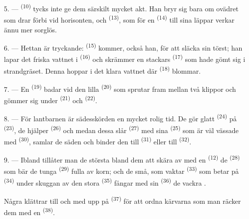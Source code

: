\VUsaut{5.0mm}
\VUsaut{3.4mm}

5. ---  \textsuperscript{(10)} tycks inte ge dem särskilt mycket akt. Han bryr
sig bara om ovädret som drar förbi vid horisonten, och
 \textsuperscript{(13)}, som för en 
\textsuperscript{(14)} till sina läppar verkar ännu mer sorglös.

6. --- Hettan är tryckande:  \textsuperscript{(15)} kommer, också han, för att
släcka sin törst; han lapar det friska vattnet i
 \textsuperscript{(16)} och skrämmer en stackars  \textsuperscript{(17)} som hade gömt sig i strandgräset. Denna hoppar i det klara
vattnet där  \textsuperscript{(18)} blommar.

7. --- En  \textsuperscript{(19)} badar vid den lilla
 \textsuperscript{(20)} som sprutar fram mellan två klippor och
gömmer sig under  \textsuperscript{(21)} och
 \textsuperscript{(22)}.

\VUsaut{5.0mm}
\VUsaut{3.4mm}

8. --- För lantbarnen är sädesskörden en mycket rolig tid. De gör glatt
 \textsuperscript{(24)} på 
\textsuperscript{(23)}, de hjälper  \textsuperscript{(26)} och medan
dessa slår  \textsuperscript{(27)} med sina
 \textsuperscript{(25)} som är väl vässade med 
\textsuperscript{(30)}, samlar de säden och binder den till 
\textsuperscript{(31)} eller till  \textsuperscript{(32)}.

9. --- Ibland tillåter man de största bland dem att skära av med en
 \textsuperscript{(12)} de 
\textsuperscript{(28)} som bär de tunga  \textsuperscript{(29)} fulla av korn;
och de små, som vaktar  \textsuperscript{(33)} som betar på
 \textsuperscript{(34)} under skuggan av den stora 
\textsuperscript{(35)} fångar med sin  \textsuperscript{(36)} de vackra
.

Några klättrar till och med upp på  \textsuperscript{(37)} för att ordna
kärvarna som man räcker dem med en  \textsuperscript{(38)}.

